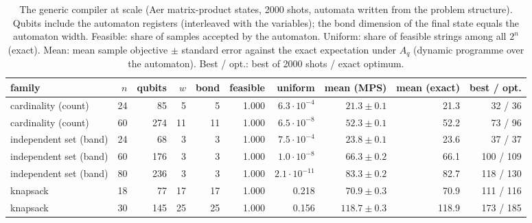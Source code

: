 \begin{table}[t]\centering\small\setlength{\tabcolsep}{3.5pt}
\caption{ The generic compiler at scale (Aer matrix-product states, 2000 shots, automata written from the problem structure). Qubits include the automaton registers (interleaved with the variables); the bond dimension of the final state equals the automaton width. Feasible: share of samples accepted by the automaton. Uniform: share of feasible strings among all $2^n$ (exact). Mean: mean sample objective $\pm$ standard error against the exact expectation under $A_q$ (dynamic programme over the automaton). Best / opt.: best of 2000 shots / exact optimum.}\label{tab:gen_scale}
\begin{tabular}{lrrrrrrrrr}\toprule
family & $n$ & qubits & $w$ & bond & feasible & uniform & mean (MPS) & mean (exact) & best / opt.\\\midrule
cardinality (count) & 24 & 85 & 5 & 5 & 1.000 & $6.3\!\cdot\!10^{-4}$ & $21.3\pm0.1$ & 21.3 & 32 / 36\\
cardinality (count) & 60 & 274 & 11 & 11 & 1.000 & $6.5\!\cdot\!10^{-8}$ & $52.3\pm0.1$ & 52.2 & 73 / 96\\
independent set (band) & 24 & 68 & 3 & 3 & 1.000 & $7.5\!\cdot\!10^{-4}$ & $23.8\pm0.1$ & 23.6 & 37 / 37\\
independent set (band) & 60 & 176 & 3 & 3 & 1.000 & $1.0\!\cdot\!10^{-8}$ & $66.3\pm0.2$ & 66.1 & 100 / 109\\
independent set (band) & 80 & 236 & 3 & 3 & 1.000 & $2.1\!\cdot\!10^{-11}$ & $83.3\pm0.2$ & 82.7 & 118 / 130\\
knapsack & 18 & 77 & 17 & 17 & 1.000 & 0.218 & $70.9\pm0.3$ & 70.9 & 111 / 116\\
knapsack & 30 & 145 & 25 & 25 & 1.000 & 0.156 & $118.7\pm0.3$ & 118.9 & 173 / 185\\
\bottomrule\end{tabular}\end{table}
